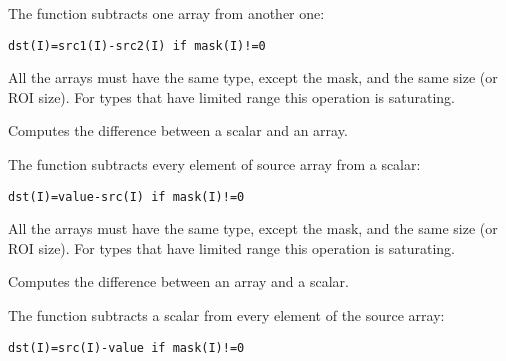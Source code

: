 The function subtracts one array from another one:

\begin{lstlisting}
dst(I)=src1(I)-src2(I) if mask(I)!=0
\end{lstlisting}

All the arrays must have the same type, except the mask, and the same size (or ROI size).
For types that have limited range this operation is saturating.

Computes the difference between a scalar and an array.


\begin{description}
\end{description}

The function subtracts every element of source array from a scalar:

\begin{lstlisting}
dst(I)=value-src(I) if mask(I)!=0
\end{lstlisting}

All the arrays must have the same type, except the mask, and the same size (or ROI size).
For types that have limited range this operation is saturating.

Computes the difference between an array and a scalar.


\begin{description}
\end{description}

The function subtracts a scalar from every element of the source array:

\begin{lstlisting}
dst(I)=src(I)-value if mask(I)!=0
\end{lstlisting}

